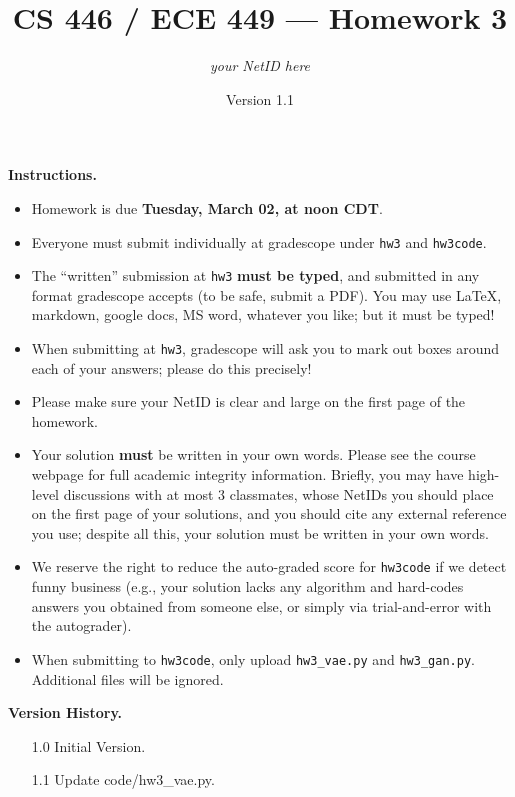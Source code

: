 \documentclass{article}
\title{CS 446 / ECE 449 --- Homework 3}
\author{\emph{your NetID here}}
\date{Version 1.1}
\theoremstyle{definition}
\theoremstyle{remark}
\begin{document}
	\maketitle
	
	\noindent\textbf{Instructions.}
	\begin{itemize}
		\item
		Homework is due \textbf{\color{red}Tuesday, March 02, at noon CDT}.
		
		\item
		Everyone must submit individually at gradescope under \texttt{hw3} and \texttt{hw3code}.
		
		\item
		The ``written'' submission at \texttt{hw3} \textbf{must be typed}, and submitted in
		any format gradescope accepts (to be safe, submit a PDF).  You may use \LaTeX, markdown,
		google docs, MS word, whatever you like; but it must be typed!
		
		\item
		When submitting at \texttt{hw3}, gradescope will ask you to mark out boxes
		around each of your answers; please do this precisely!
		
		\item
		Please make sure your NetID is clear and large on the first page of the homework.
		
		\item
		Your solution \textbf{must} be written in your own words.
		Please see the course webpage for full academic integrity information.
		Briefly, you may have high-level discussions with at most 3 classmates,
		whose NetIDs you should place on the first page of your solutions,
		and you should cite any external reference you use; despite all this,
		your solution must be written in your own words.
		
		\item
		We reserve the right to reduce the auto-graded score for
		\texttt{hw3code} if we detect funny business (e.g., your solution
		lacks any algorithm and hard-codes answers you obtained from
		someone else, or simply via trial-and-error with the autograder).
		
		\item
		When submitting to \texttt{hw3code}, only upload \texttt{hw3\_vae.py} and \texttt{hw3\_gan.py}. Additional files will be ignored.
		
	\end{itemize}
	
	\noindent\textbf{Version History.}
	\begin{enumerate}[leftmargin=3\parindent]
		\item[1.0]
		Initial Version.
		\item[1.1]
		Update code/hw3\_vae.py.
	\end{enumerate}
	
\end{document}
